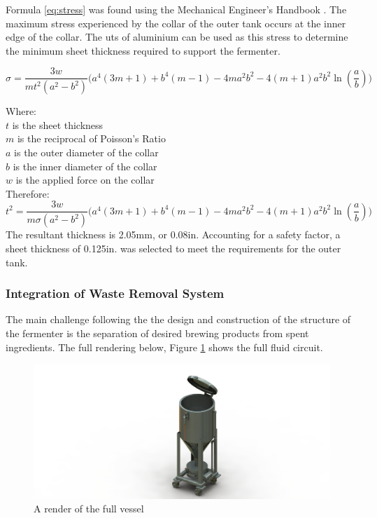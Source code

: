 \documentclass{article}
\begin{document}
Formula \ref{eq:stress} was found using the Mechanical Engineer's Handbook \cite{mech-handbook}.
The maximum stress experienced by the collar of the outer tank occurs at the inner edge of the collar.  The \gls{uts} of aluminium can be used as this stress to determine the minimum sheet thickness required to support the fermenter.

\begin{equation}
\sigma = \frac{3w}{mt^{2}(a^{2} - b^{2})}\Big(a^{4}(3m + 1) + b^{4}(m - 1) - 4ma^{2}b^{2} - 4(m + 1)a^{2}b^{2}\ln(\frac{a}{b}) \Big)
\label{eq:stress}
\end{equation}

\noindent Where: \\
$t$ is the sheet thickness\\
$m$ is the reciprocal of Poisson's Ratio\\
$a$ is the outer diameter of the collar\\
$b$ is the inner diameter of the collar\\
$w$ is the applied force on the collar\\

\noindent Therefore:
\begin{equation}
t^{2} = \frac{3w}{m\sigma(a^{2} - b^{2})}\Big(a^{4}(3m + 1) + b^{4}(m - 1) - 4ma^{2}b^{2} - 4(m + 1)a^{2}b^{2}\ln(\frac{a}{b}) \Big)
\end{equation}
The resultant thickness is 2.05mm, or 0.08in. Accounting for a safety factor, a sheet thickness of 0.125in. was selected to meet the requirements for the outer tank.

\subsubsection{Integration of Waste Removal System}\label{sec:waste-removal}
The main challenge following the the design and construction of the structure of the fermenter is the separation of desired brewing products from spent ingredients.  The full rendering below, Figure \ref{fig:full-vessel-render} shows the full fluid circuit.

\begin{figure}[H]
\begin{center}
\includegraphics[scale=1]{full-vessel-render.png}
\caption{A render of the full vessel}
\label{fig:full-vessel-render}
\end{center}
\end{figure}
\end{document}
